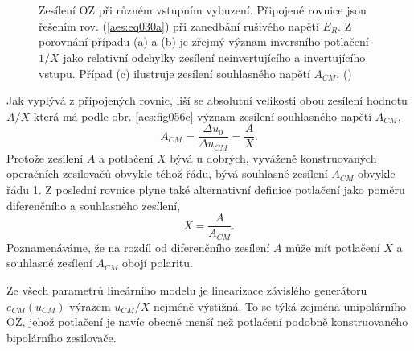         \begin{figure}[ht!]  %
          \centering
            {}          \\                                                      
            {}          \\                                                 
            {}             
          \caption{Zesílení OZ při různém vstupním vybuzení. Připojené rovnice jsou řešením rov.
                  (\ref{aes:eq030a}) při zanedbání rušivého napětí \(E_R\). Z porovnání případu (a)
                  a (b) je zřejmý význam inversního potlačení \(1/X\) jako relativní odchylky 
                  zesílení neinvertujícího a invertujícího vstupu. Případ (c) ilustruje zesílení 
                  souhlasného napětí \(A_{CM}\). (\cite[s.~28]{Dostal})}
          \label{aes:fig056}
        \end{figure}

        Jak vyplývá z připojených rovnic, liší se absolutní velikosti obou zesílení hodnotu \(A/X\)
        která má podle obr. \ref{aes:fig056c} význam zesílení souhlasného napětí \(A_{CM}\),
        \begin{equation*}
          A_{CM} = \dfrac{\Delta u_0}{\Delta u_{CM}} = \dfrac{A}{X}.
        \end{equation*}
        Protože zesílení \(A\) a potlačení \(X\) bývá u dobrých, vyváženě konstruovaných operačních
        zesilovačů obvykle téhož řádu, bývá souhlasné zesílení \(A_{CM}\) obvykle řádu 1. Z poslední
        rovnice plyne také alternativní definice potlačení jako poměru diferenčního a souhlasného
        zesílení,
        \begin{equation*}
          X = \dfrac{A}{A_{CM}}.
        \end{equation*}
        Poznamenáváme, že na rozdíl od diferenčního zesílení \(A\) může mít potlačení \(X\) a
        souhlasné zesílení \(A_{CM}\) obojí polaritu.

        Ze všech parametrů lineárního modelu je linearizace závislého generátoru \(e_{CM}(u_{CM})\)
        výrazem \(u_{CM}/X\) nejméně výstižná. To se týká zejména unipolárního OZ, jehož potlačení
        je navíc obecně menší než potlačení podobně konstruovaného bipolárního zesilovače.

